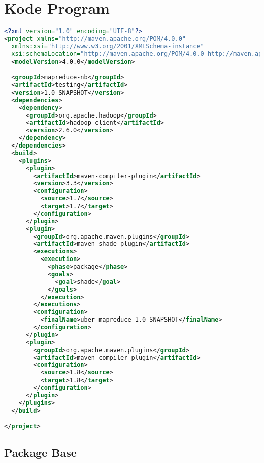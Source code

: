 \section{Kode Program}
\singlespacing 
%
%
\begin{lstlisting}[language=xml,basicstyle=\tiny,caption=pom.xml]
<?xml version="1.0" encoding="UTF-8"?>
<project xmlns="http://maven.apache.org/POM/4.0.0"
  xmlns:xsi="http://www.w3.org/2001/XMLSchema-instance"
  xsi:schemaLocation="http://maven.apache.org/POM/4.0.0 http://maven.apache.org/xsd/maven-4.0.0.xsd">
  <modelVersion>4.0.0</modelVersion>

  <groupId>mapreduce-nb</groupId>
  <artifactId>testing</artifactId>
  <version>1.0-SNAPSHOT</version>
  <dependencies>
    <dependency>
      <groupId>org.apache.hadoop</groupId>
      <artifactId>hadoop-client</artifactId>
      <version>2.6.0</version>
    </dependency>
  </dependencies>
  <build>
    <plugins>
      <plugin>
        <artifactId>maven-compiler-plugin</artifactId>
        <version>3.3</version>
        <configuration>
          <source>1.7</source>
          <target>1.7</target>
        </configuration>
      </plugin>
      <plugin>
        <groupId>org.apache.maven.plugins</groupId>
        <artifactId>maven-shade-plugin</artifactId>
        <executions>
          <execution>
            <phase>package</phase>
            <goals>
              <goal>shade</goal>
            </goals>
          </execution>
        </executions>
        <configuration>
          <finalName>uber-mapreduce-1.0-SNAPSHOT</finalName>
        </configuration>
      </plugin>
      <plugin>
        <groupId>org.apache.maven.plugins</groupId>
        <artifactId>maven-compiler-plugin</artifactId>
        <configuration>
          <source>1.8</source>
          <target>1.8</target>
        </configuration>
      </plugin>
    </plugins>
  </build>

</project>
\end{lstlisting}

\subsection{Package Base}

